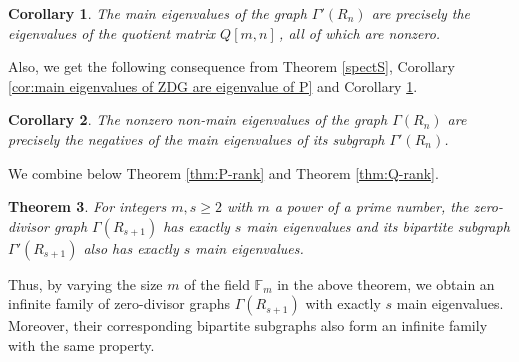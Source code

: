 \documentclass[11pt,oneside]{article}
\theoremstyle{plain}
\theoremstyle{plain}
\newtheorem{theorem}{Theorem}[section]
\newtheorem{corollary}[theorem]{Corollary}
\theoremstyle{definition}
\numberwithin{figure}{section}
\theoremstyle{remark}
\numberwithin{equation}{section}
\begin{document}
		\begin{corollary}\label{mainQcor}
			The main eigenvalues of the graph $\Gamma'(R_n)$ are precisely the eigenvalues of the quotient matrix $Q[m, n]$\,, all of which are nonzero.   
		\end{corollary}
		Also, we get the following consequence from  Theorem \ref{spectS}, Corollary \ref{cor:main eigenvalues of ZDG are eigenvalue of P} and Corollary \ref{mainQcor}. 
		\begin{corollary}\label{non-main}
			The nonzero non-main eigenvalues of the graph $\Gamma(R_n)$ are precisely the negatives of the main eigenvalues of its subgraph $\Gamma'(R_n)$.   
		\end{corollary}
		
		
		We combine below  Theorem \ref{thm:P-rank} and Theorem \ref{thm:Q-rank}. 
		\begin{theorem}
			For integers $m, s \geq 2$ with $m$ a power of a prime number,  the zero-divisor graph $\Gamma(R_{s+1})$ has exactly $s$ main eigenvalues and its bipartite subgraph $\Gamma'(R_{s+1})$ also has exactly $s$ main eigenvalues.
		\end{theorem}
		Thus, by varying the size $m$ of the field $\mathbb{F}_m$ in the above theorem,  we obtain an infinite family of zero-divisor graphs $\Gamma(R_{s+1})$  with exactly $s$ main eigenvalues. Moreover, their corresponding bipartite subgraphs also form an infinite family with the same property.
		
\end{document}
